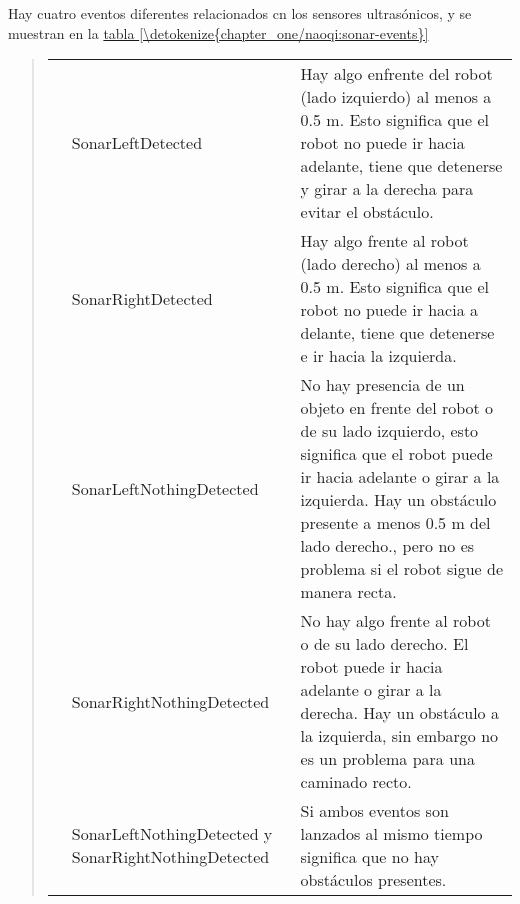 Hay cuatro eventos diferentes relacionados cn los sensores ultrasónicos, y se
muestran en la \hyperref[\detokenize{chapter_one/naoqi:sonar-events}]{tabla \ref{\detokenize{chapter_one/naoqi:sonar-events}}}
\begin{quote}
\begin{savenotes}\sphinxattablestart
\centering
{}
\label{\detokenize{chapter_one/naoqi:sonar-events}}
\sphinxaftercaption
\begin{tabulary}{\linewidth}[t]{|T|T|T|}
\hline
{}\relax &\relax &\relax \\
\hline
\noindent{}
&
SonarLeftDetected
&
Hay algo enfrente del robot (lado izquierdo) al menos a 0.5 m. Esto significa que el robot no puede ir hacia adelante, tiene que detenerse y girar a la derecha para evitar el obstáculo.
\\
\hline
\noindent{}
&
SonarRightDetected
&
Hay algo frente al robot (lado derecho) al menos a 0.5 m. Esto significa que el robot no puede ir hacia a delante, tiene que detenerse e ir hacia la izquierda.
\\
\hline
\noindent{}
&
SonarLeftNothingDetected
&
No hay presencia de un objeto en frente del robot o de su lado izquierdo, esto significa que el robot puede ir hacia adelante o girar a la izquierda. Hay un obstáculo presente a menos 0.5 m del lado derecho., pero no es problema si el robot sigue de manera recta.
\\
\hline
\noindent{}
&
SonarRightNothingDetected
&
No hay algo frente al robot o de su lado derecho. El robot puede ir hacia adelante o girar a la derecha. Hay un obstáculo a la izquierda, sin embargo no es un problema para una caminado recto.
\\
\hline
\noindent{}
&
SonarLeftNothingDetected y SonarRightNothingDetected
&
Si ambos eventos son lanzados al mismo tiempo significa que no hay obstáculos presentes.
\\
\hline
\end{tabulary}
\par
\sphinxattableend\end{savenotes}
\end{quote}

